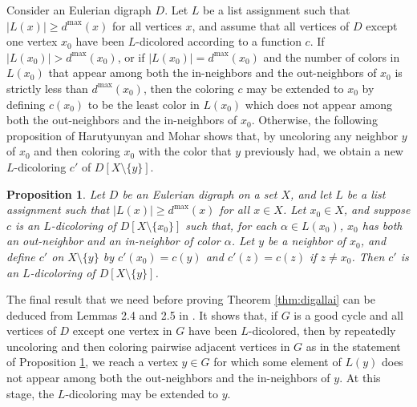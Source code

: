 \documentclass[psamsfonts]{amsart}
\newtheorem{prop}[thm]{Proposition}
\theoremstyle{definition}
\theoremstyle{remark}
\numberwithin{equation}{section}
\begin{document}
Consider an Eulerian digraph $D$. Let $L$ be a list assignment such that $\vert L(x) \vert \geq d^{\max}(x)$ for all vertices $x$, and assume that all vertices of $D$ except one vertex $x_0$ have been $L$-dicolored according to a function $c$. If $\vert L(x_0) \vert > d^{\max}(x_0)$, or if $\vert L(x_0) \vert = d^{\max}(x_0)$ and the number of colors in $L(x_0)$ that appear among both the in-neighbors and the out-neighbors of $x_0$ is strictly less than $d^{\max}(x_0)$, then the coloring $c$ may be extended to $x_0$ by defining $c(x_0)$ to be the least color in $L(x_0)$ which does not appear among both the out-neighbors and the in-neighbors of $x_0$. Otherwise, the following proposition of Harutyunyan and Mohar shows that, by uncoloring any neighbor $y$ of $x_0$ and then coloring $x_0$ with the color that $y$ previously had, we obtain a new $L$-dicoloring $c'$ of $D[X \setminus \{y \}]$.

\begin{prop}
    \cite[Lemma~2.2]{hm2011} 
    \label{prop:single vertex extension}
    Let $D$ be an Eulerian digraph on a set $X$, and let $L$ be a list assignment such that $\vert L(x) \vert \geq d^{\max}(x)$ for all $x \in X$. Let $x_0 \in X$, and suppose $c$ is an $L$-dicoloring of $D[X \setminus \{x_0\}]$ such that, for each $\alpha \in L(x_0)$, $x_0$ has both an out-neighbor and an in-neighbor of color $\alpha$. Let $y$ be a neighbor of $x_0$, and define $c'$ on $X \setminus \{y\}$ by $c'(x_0) = c(y)$ and $c'(z) = c(z)$ if $z \neq x_0$. Then $c'$ is an $L$-dicoloring of $D[X \setminus \{y\}]$.
\end{prop}

The final result that we need before proving Theorem \ref{thm:digallai} can be deduced from Lemmas 2.4 and 2.5 in \cite{hm2011}. It shows that, if $G$ is a good cycle and all vertices of $D$ except one vertex in $G$ have been $L$-dicolored, then by repeatedly uncoloring and then coloring pairwise adjacent vertices in $G$ as in the statement of Proposition \ref{prop:single vertex extension}, we reach a vertex $y \in G$ for which some element of $L(y)$ does not appear among both the out-neighbors and the in-neighbors of $y$. At this stage, the $L$-dicoloring may be extended to $y$.
\end{document}
